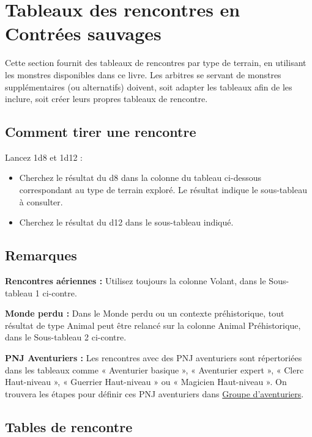 \section*{Tableaux des rencontres en Contrées sauvages}\label{tableaux-des-rencontres-en-contruxe9es-sauvages}

Cette section fournit des tableaux de rencontres par type de terrain, en
utilisant les monstres disponibles dans ce livre. Les arbitres se
servant de monstres supplémentaires (ou alternatifs) doivent, soit
adapter les tableaux afin de les inclure, soit créer leurs propres
tableaux de rencontre.

\subsection*{Comment tirer une rencontre}\label{comment-tirer-une-rencontre}

Lancez 1d8 et 1d12 :~

\begin{itemize}
\item
  Cherchez le résultat du d8 dans la colonne du tableau ci-dessous
  correspondant au type de terrain exploré. Le résultat indique le
  sous-tableau à consulter.
\item
  Cherchez le résultat du d12 dans le sous-tableau indiqué.
\end{itemize}

\subsection*{Remarques}\label{remarques}

\textbf{Rencontres aériennes :} Utilisez toujours la colonne Volant,
dans le Sous-tableau 1 ci-contre.

\textbf{Monde perdu :} Dans le Monde perdu ou un contexte préhistorique,
tout résultat de type Animal peut être relancé sur la colonne Animal
Préhistorique, dans le Sous-tableau 2 ci-contre.

\textbf{PNJ Aventuriers :} Les rencontres avec des PNJ aventuriers sont
répertoriées dans les tableaux comme « Aventurier basique », «
Aventurier expert », « Clerc Haut-niveau », « Guerrier Haut-niveau » ou
« Magicien Haut-niveau ». On trouvera les étapes pour définir ces PNJ
aventuriers dans \href{Groupe_d’aventuriers.md}{Groupe d'aventuriers}.

\subsection*{Tables de rencontre}

